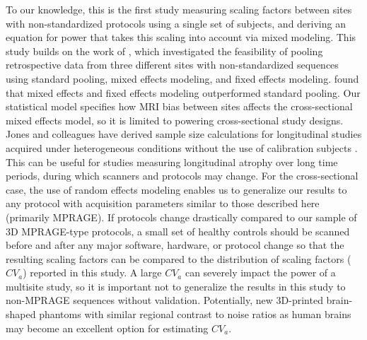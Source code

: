 To our knowledge, this is the first study measuring scaling factors between sites with non-standardized protocols using a single set of subjects, and deriving an equation for power that takes this scaling into account via mixed modeling. This study builds on the work of \cite{fennema2007feasibility}, which investigated the feasibility of pooling retrospective data from three different sites with non-standardized sequences using standard pooling, mixed effects modeling, and fixed effects modeling. \cite{fennema2007feasibility} found that mixed effects and fixed effects modeling outperformed standard pooling. Our statistical model specifies how MRI bias between sites affects the cross-sectional mixed effects model, so it is limited to powering cross-sectional study designs. Jones and colleagues have derived sample size calculations for longitudinal studies acquired under heterogeneous conditions without the use of calibration subjects \cite{jones2013quantification}. This can be useful for studies measuring longitudinal atrophy over long time periods, during which scanners and protocols may change. For the cross-sectional case, the use of random effects modeling enables us to generalize our results to any protocol with acquisition parameters similar to those described here (primarily MPRAGE). If protocols change drastically compared to our sample of 3D MPRAGE-type protocols, a small set of healthy controls should be scanned before and after any major software, hardware, or protocol change so that the resulting scaling factors can be compared to the distribution of scaling factors ($CV_a$) reported in this study. A large $CV_a$ can severely impact the power of a multisite study, so it is important not to generalize the results in this study to non-MPRAGE sequences without validation. Potentially, new 3D-printed brain-shaped phantoms with similar regional contrast to noise ratios as human brains may become an excellent option for estimating $CV_a$.